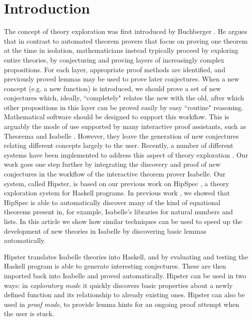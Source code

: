 \section{Introduction}
\label{sec:intro}
The concept of theory exploration was first introduced by Buchberger
\cite{buchberger2000theory}. He argues that in contrast to automated
theorem provers that focus on proving one theorem at the time in
isolation, mathematicians instead typically proceed by exploring
entire theories, by conjecturing and proving layers of increasingly
complex propositions. For each layer, appropriate proof methods are
identified, and previously proved lemmas may be used to prove later
conjectures. When a new concept (e.g. a new function) is introduced,
we should prove a set of new conjectures which, ideally, ``completely"
relates the new with the old, after which other propositions in this
layer can be proved easily by easy ``routine" reasoning. Mathematical
software should be designed to support this workflow. This is arguably
the mode of use supported by many interactive proof assistants, such
as Theorema \cite{theorema} and Isabelle \cite{isabelle}. However,
they leave the generation of new conjectures relating different
concepts largely to the user. Recently, a number of different systems
have been implemented to address this aspect of theory exploration
\cite{McCasland2006,isacosy,isascheme,hipspecCADE}. Our work goes one
step further by integrating the discovery and proof of new conjectures
in the workflow of the interactive theorem prover Isabelle. Our
system, called Hipster, is based on our previous work on HipSpec
\cite{hipspecCADE}, a theory exploration system for Haskell programs.
In previous work \cite{hipspecCADE}, we showed that HipSpec is able to
automatically discover many of the kind of equational theorems present
in, for example, Isabelle's libraries for natural numbers and lists.
In this article we show how similar techniques can be used to speed up the
development of new theories in Isabelle by discovering basic lemmas
automatically.

Hipster translates Isabelle theories into Haskell, and by evaluating
and testing the Haskell program is able to generate interesting
conjectures. These are then
imported back into Isabelle and proved automatically. Hipster can be
used in two ways: in \emph{exploratory mode} it quickly discovers
basic properties about a newly defined function and its relationship
to already existing ones. Hipster can also be used in \emph{proof
  mode}, to provide lemma hints for an ongoing proof attempt when the
user is stuck.

